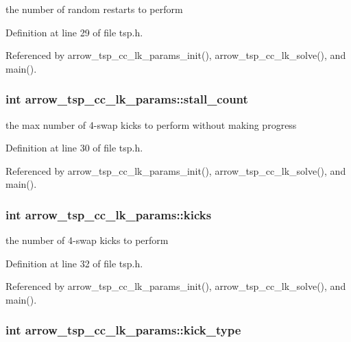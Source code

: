 the number of random restarts to perform 

Definition at line 29 of file tsp.h.

Referenced by arrow\_\-tsp\_\-cc\_\-lk\_\-params\_\-init(), arrow\_\-tsp\_\-cc\_\-lk\_\-solve(), and main().\hypertarget{structarrow__tsp__cc__lk__params_dee46e401d6f6eca9f9a0d1f376c6ebe}{
\subsubsection{\setlength{\rightskip}{0pt plus 5cm}int {\bf arrow\_\-tsp\_\-cc\_\-lk\_\-params::stall\_\-count}}}
\label{structarrow__tsp__cc__lk__params_dee46e401d6f6eca9f9a0d1f376c6ebe}


the max number of 4-swap kicks to perform without making progress 

Definition at line 30 of file tsp.h.

Referenced by arrow\_\-tsp\_\-cc\_\-lk\_\-params\_\-init(), arrow\_\-tsp\_\-cc\_\-lk\_\-solve(), and main().\hypertarget{structarrow__tsp__cc__lk__params_5912b1978195270052497e56d8dbffae}{
\subsubsection{\setlength{\rightskip}{0pt plus 5cm}int {\bf arrow\_\-tsp\_\-cc\_\-lk\_\-params::kicks}}}
\label{structarrow__tsp__cc__lk__params_5912b1978195270052497e56d8dbffae}


the number of 4-swap kicks to perform 

Definition at line 32 of file tsp.h.

Referenced by arrow\_\-tsp\_\-cc\_\-lk\_\-params\_\-init(), arrow\_\-tsp\_\-cc\_\-lk\_\-solve(), and main().\hypertarget{structarrow__tsp__cc__lk__params_d5973ec2e377d3526911cfbc8deb2e47}{
\subsubsection{\setlength{\rightskip}{0pt plus 5cm}int {\bf arrow\_\-tsp\_\-cc\_\-lk\_\-params::kick\_\-type}}}
\label{structarrow__tsp__cc__lk__params_d5973ec2e377d3526911cfbc8deb2e47}


